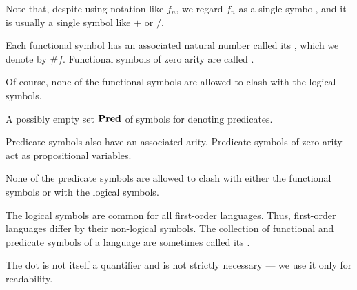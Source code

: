 \begin{definition}
\begin{description}
\begin{thmenum}[resume=def:first_order_language]
      Note that, despite using notation like \( f_n \), we regard \( f_n \) as a single symbol, and it is usually a single symbol like \( + \) or \( / \).

      Each functional symbol has an associated natural number called its , which we denote by \( \# f \). Functional symbols of zero arity are called .

      Of course, none of the functional symbols are allowed to clash with the logical symbols.

       A possibly empty  set \( \operatorname{\mathbf{Pred}} \) of symbols for denoting predicates.

      Predicate symbols also have an associated arity. Predicate symbols of zero arity act as \hyperref[def:propositional_syntax/prop]{propositional variables}.

      None of the predicate symbols are allowed to clash with either the functional symbols or with the logical symbols.
    \end{thmenum}
  \end{description}

  The logical symbols are common for all first-order languages. Thus, first-order languages differ by their non-logical symbols. The collection of functional and predicate symbols of a language are sometimes called its .
\end{definition}
\begin{comments}
  \item The dot is not itself a quantifier and is not strictly necessary --- we use it only for readability.
\end{comments}

